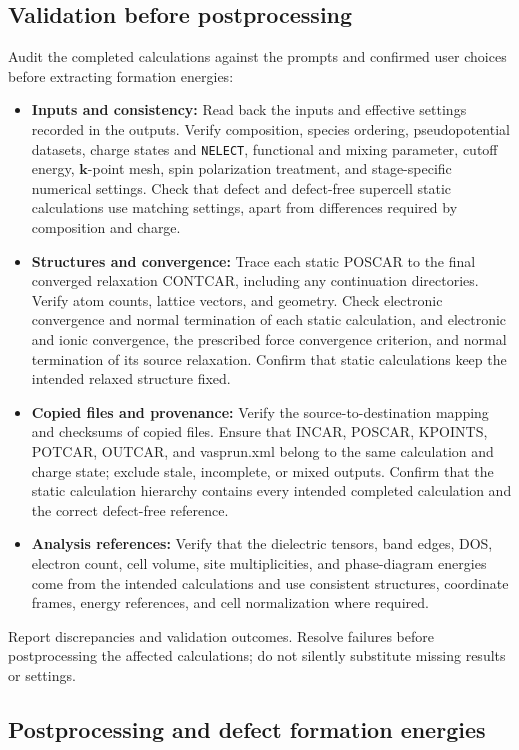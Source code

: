 \documentclass[aip,jap,reprint,amsmath,amssymb]{revtex4-2}
\begin{document}
\subsection{Validation before postprocessing}\label{step:validation}

Audit the completed calculations against the prompts and confirmed user choices before extracting formation energies:
\begin{itemize}
    \item \textbf{Inputs and consistency:} Read back the inputs and effective settings recorded in the outputs. Verify composition, species ordering, pseudopotential datasets, charge states and \texttt{NELECT}, functional and mixing parameter, cutoff energy, $\bm{k}$-point mesh, spin polarization treatment, and stage-specific numerical settings. Check that defect and defect-free supercell static calculations use matching settings, apart from differences required by composition and charge.
    \item \textbf{Structures and convergence:} Trace each static POSCAR to the final converged relaxation CONTCAR, including any continuation directories. Verify atom counts, lattice vectors, and geometry. Check electronic convergence and normal termination of each static calculation, and electronic and ionic convergence, the prescribed force convergence criterion, and normal termination of its source relaxation. Confirm that static calculations keep the intended relaxed structure fixed.
    \item \textbf{Copied files and provenance:} Verify the source-to-destination mapping and checksums of copied files. Ensure that INCAR, POSCAR, KPOINTS, POTCAR, OUTCAR, and vasprun.xml belong to the same calculation and charge state; exclude stale, incomplete, or mixed outputs. Confirm that the static calculation hierarchy contains every intended completed calculation and the correct defect-free reference.
    \item \textbf{Analysis references:} Verify that the dielectric tensors, band edges, DOS, electron count, cell volume, site multiplicities, and phase-diagram energies come from the intended calculations and use consistent structures, coordinate frames, energy references, and cell normalization where required.
\end{itemize}
Report discrepancies and validation outcomes. Resolve failures before postprocessing the affected calculations; do not silently substitute missing results or settings.

\subsection{Postprocessing and defect formation energies}\label{step:post}
\end{document}
